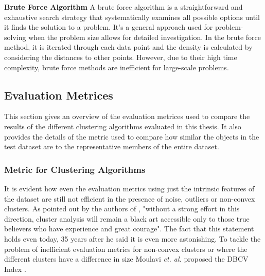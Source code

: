 \vspace{5mm}

\textbf{Brute Force Algorithm}
A brute force algorithm is a straightforward and exhaustive search strategy that systematically examines all possible options until it finds the solution to a problem. It’s a general approach used for problem-solving when the problem size allows for detailed investigation. In the brute force method, it is iterated through each data point and the density is calculated by considering the distances to other points. However, due to their high time complexity, brute force methods are inefficient for large-scale problems.

\subsection{Evaluation Metrices}
This section gives an overview of the evaluation metrices used to compare the results of the different clustering algorithms evaluated in this thesis. It also provides the details of the metric used to compare how similar the objects in the test dataset are to the representative members of the entire dataset. 
\subsubsection{Metric for Clustering Algorithms}
It is evident how even the evaluation metrics using just the intrinsic features of the dataset are still not efficient in the presence of noise, outliers or non-convex clusters. As pointed out by the authors of \cite{jain1988algorithms}, "without a strong effort in this direction, cluster analysis will remain a black art accessible only to those true believers who have experience and great courage". The fact that this statement holds even today, 35 years after he said it is even more astonishing. To tackle the problem of inefficient evaluation metrics for non-convex clusters or where the different clusters have a difference in size Moulavi \textit{et. al.} proposed the \ac{DBCV} Index \cite{moulavi2014density}.

